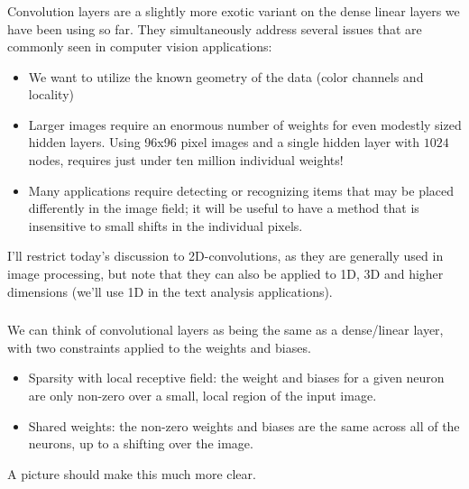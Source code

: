 \documentclass[xetex,mathserif,serif,aspectratio=169]{beamer}
\begin{document}
\begin{frame}[fragile] \frametitle{} \oldB \small

\textbf{}

Convolution layers are a slightly more exotic variant on the dense
linear layers we have been using so far. They simultaneously address
several issues that are commonly seen in computer vision applications: \pause
\begin{itemize}
\item We want to utilize the known geometry of the data (color channels
and locality) \pause
\item Larger images require an enormous number of weights for even modestly
sized hidden layers. Using 96x96 pixel images and a single hidden layer with
$1024$ nodes, requires just under ten million individual weights! \pause
\item Many applications require detecting or recognizing items that may be
placed differently in the image field; it will be useful to have a method
that is insensitive to small shifts in the individual pixels.
\end{itemize}
I'll restrict today's discussion to 2D-convolutions, as they are generally
used in image processing, but note that they can also be applied to 1D, 3D
and higher dimensions (we'll use 1D in the text analysis applications).

\end{frame}

\begin{frame}[fragile] \frametitle{} \oldB \small

\textbf{}

We can think of convolutional layers as being the same as a dense/linear
layer, with two constraints applied to the weights and biases.
\begin{itemize}
\item Sparsity with local receptive field: the weight and biases for a given neuron
are only non-zero over a small, local region of the input image.
\item Shared weights: the non-zero weights and biases are the same across all of the
neurons, up to a shifting over the image.
\end{itemize}
A picture should make this much more clear.

\end{frame}
\end{document}
